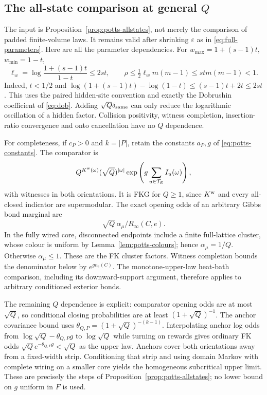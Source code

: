 \subsection{The all-state comparison at general \texorpdfstring{$Q$}{Q}}\label{sec:full-comparison}
The input is Proposition~\ref{prop:potts-allstates}, not merely the comparison of padded finite-volume laws. It remains valid after shrinking $\varepsilon$ as in \eqref{eq:full-parameters}. Here are all the parameter dependencies.
For $w_{\max}=1+(s-1)t$, $w_{\min}=1-t$,
\begin{equation}\label{eq:full-hidden}
 \ell_w=\log\frac{1+(s-1)t}{1-t}\le2st,\qquad
 \rho\le\tfrac12\ell_w m(m-1)\le st m(m-1)<1.
\end{equation}
Indeed, $t<1/2$ and $\log(1+(s-1)t)-\log(1-t)\le(s-1)t+2t\le2st$.
This uses the paired hidden-site convention and exactly the Dobrushin coefficient of \eqref{eq:dob}. Adding $\sqrt Q\delta_{\rm same}$ can only reduce the logarithmic oscillation of a hidden factor. Collision positivity, witness completion, insertion-ratio convergence and onto cancellation have no $Q$ dependence.

For completeness, if $c_P>0$ and $k=|P|$, retain the constants $a_P,g$ of \eqref{eq:potts-constants}. The comparator is
\[
 Q^{K^{\rm w}(\omega)}(\sqrt Q)^{|\omega|}
 \exp\left(g\sum_{u\in\mathcal T_E}I_u(\omega)\right),
\]
with witnesses in both orientations. It is FKG for $Q\ge1$, since $K^{\rm w}$ and every all-closed indicator are supermodular. The exact opening odds of an arbitrary Gibbs bond marginal are
\[
 \sqrt Q\,\alpha_\mu/R_\infty(C,e).
\]
In the fully wired core, disconnected endpoints include a finite full-lattice cluster, whose colour is uniform by Lemma~\ref{lem:potts-colours}; hence $\alpha_\mu=1/Q$. Otherwise $\alpha_\mu\le1$. These are the FK cluster factors. Witness completion bounds the denominator below by $e^{gn_e(C)}$. The monotone-upper-law heat-bath comparison, including its downward-support argument, therefore applies to arbitrary conditioned exterior bonds.

The remaining $Q$ dependence is explicit: comparator opening odds are at most $\sqrt Q$, so conditional closing probabilities are at least $(1+\sqrt Q)^{-1}$. The anchor covariance bound uses
$\theta_{Q,P}=(1+\sqrt Q)^{-(k-1)}$. Interpolating anchor log odds from $\log\sqrt Q-\theta_{Q,P}g$ to $\log\sqrt Q$ while turning on rewards gives ordinary FK odds $\sqrt Qe^{-\theta_{Q,P}g}<\sqrt Q$ as the upper law. Anchors cover both orientations away from a fixed-width strip. Conditioning that strip and using domain Markov with complete wiring on a smaller core yields the homogeneous subcritical upper limit. These are precisely the steps of Proposition~\ref{prop:potts-allstates}; no lower bound on $g$ uniform in $F$ is used.

